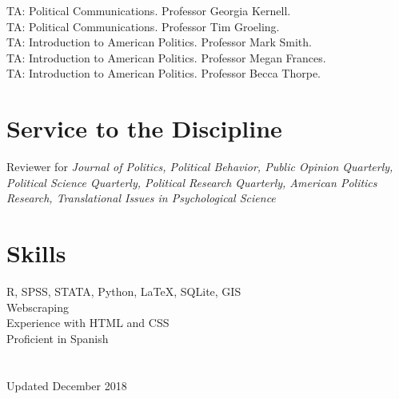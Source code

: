 \documentclass[11pt, a4paper]{article}
\newcommand{\years}[1]{\marginnote{\scriptsize #1}}
\begin{document}
\years{2018} TA: Political Communications. Professor Georgia Kernell.\\
\years{} TA: Political Communications. Professor Tim Groeling.\\
\years{2015} TA: Introduction to American Politics. Professor Mark Smith.\\
\years{} TA: Introduction to American Politics. Professor Megan Frances.\\
\years{2014} TA: Introduction to American Politics. Professor Becca Thorpe.

\section*{Service to the Discipline}

Reviewer for \textit{Journal of Politics, Political Behavior, Public Opinion Quarterly, Political Science Quarterly, Political Research Quarterly, American Politics Research, Translational Issues in Psychological Science}

\section*{Skills}

R, SPSS, STATA, Python, \LaTeX, SQLite, GIS\\
Webscraping\\
Experience with HTML and CSS\\
Proficient in Spanish\\
\\
\\
Updated December 2018
\end{document}
